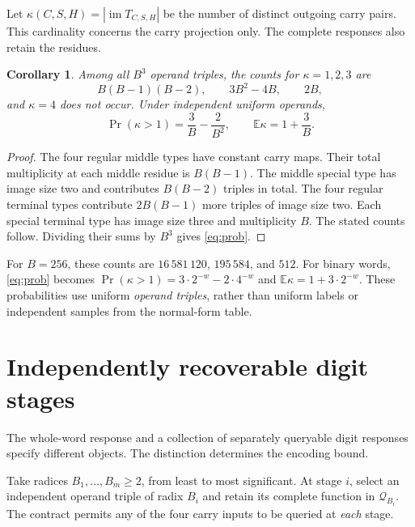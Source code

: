 \documentclass[11pt,a4paper]{article}
\newtheorem{corollary}[theorem]{Corollary}
\theoremstyle{definition}\newtheorem{definition}[theorem]{Definition}
\DeclareMathOperator{\im}{im}
\begin{document}
Let $\kappa(C,S,H)=|\im T_{C,S,H}|$ be the number of distinct outgoing
carry pairs. This cardinality concerns the carry projection only.
The complete responses also retain the residues.

\begin{corollary}\label{cor:rank}
Among all $B^3$ operand triples, the counts for $\kappa=1,2,3$ are
\[
 B(B-1)(B-2),\qquad 3B^2-4B,\qquad 2B,
\]
and $\kappa=4$ does not occur. Under independent uniform operands,
\begin{equation}\label{eq:prob}
 \Pr(\kappa>1)=\frac3B-\frac2{B^2},\qquad
 \mathbb E\kappa=1+\frac3B.
\end{equation}
\end{corollary}
\begin{proof}
The four regular middle types have constant carry maps. Their total
multiplicity at each middle residue is $B(B-1)$. The middle special
type has image size two and contributes $B(B-2)$ triples in total.
The four regular terminal types contribute $2B(B-1)$ more triples of
image size two. Each special terminal type has image size three and
multiplicity $B$. The stated counts follow. Dividing their sums by
$B^3$ gives \eqref{eq:prob}.
\end{proof}

For $B=256$, these counts are $16\,581\,120$, $195\,584$, and $512$.
For binary words, \eqref{eq:prob} becomes
$\Pr(\kappa>1)=3\cdot2^{-w}-2\cdot4^{-w}$ and
$\mathbb E\kappa=1+3\cdot2^{-w}$.
These probabilities use uniform \emph{operand triples}, rather than
uniform labels or independent samples from the normal-form table.

\section{Independently recoverable digit stages}
The whole-word response and a collection of separately queryable digit
responses specify different objects. The distinction determines the
encoding bound.

Take radices $B_1,\ldots,B_m\geq2$, from least to most significant.
At stage $i$, select an independent operand triple of radix $B_i$ and
retain its complete function in $\mathcal Q_{B_i}$. The contract permits
any of the four carry inputs to be queried at \emph{each} stage.
\end{document}
